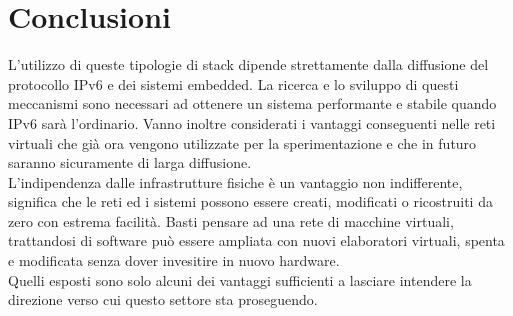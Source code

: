
\chapter*{Conclusioni}
L'utilizzo di queste tipologie di stack dipende strettamente dalla diffusione del protocollo IPv6 e dei sistemi embedded.
La ricerca e lo sviluppo di questi meccanismi sono necessari ad ottenere un sistema performante e stabile quando IPv6 sar\`a l'ordinario. Vanno inoltre considerati i vantaggi conseguenti nelle reti virtuali che gi\`a ora vengono utilizzate per la sperimentazione e che in futuro saranno sicuramente di larga diffusione.\\
L'indipendenza dalle infrastrutture fisiche \`e un vantaggio non indifferente, significa che le reti ed i sistemi possono essere creati, modificati o ricostruiti da zero con estrema facilit\`a. Basti pensare ad una rete di macchine virtuali, trattandosi di software pu\`o essere ampliata con nuovi elaboratori virtuali, spenta e modificata senza dover invesitire in nuovo hardware.\\
Quelli esposti sono solo alcuni dei vantaggi sufficienti a lasciare intendere la direzione verso cui questo settore sta proseguendo.
